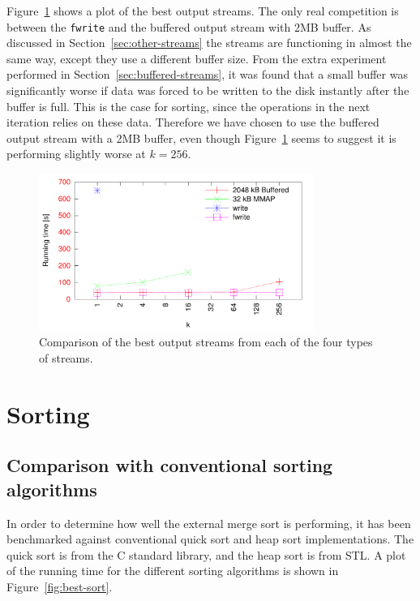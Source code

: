 \documentclass[a4paper,12pt]{article}
\begin{document}
Figure~\ref{fig:best-output} shows a plot of the best output
streams. The only real competition is between the \texttt{fwrite} and
the buffered output stream with 2MB buffer. As discussed in
Section~\ref{sec:other-streams} the streams are functioning in almost
the same way, except they use a different buffer size. From the extra
experiment performed in Section~\ref{sec:buffered-streams}, it was
found that a small buffer was significantly worse if data was forced
to be written to the disk instantly after the buffer is full. This is
the case for sorting, since the operations in the next iteration
relies on these data. Therefore we have chosen to use the buffered
output stream with a 2MB buffer, even though
Figure~\ref{fig:best-output} seems to suggest it is performing
slightly worse at $k = 256$.

\begin{figure}[h!]
  \centering
  \includegraphics[width=0.8\textwidth]{best_output}
  \caption{Comparison of the best output streams from each of the four
    types of streams.}
  \label{fig:best-output}
\end{figure}

\section{Sorting}

\subsection{Comparison with conventional sorting algorithms}
In order to determine how well the external merge sort is performing,
it has been benchmarked against conventional quick sort and heap sort
implementations. The quick sort is from the C standard library, and
the heap sort is from STL. A plot of the running time for the
different sorting algorithms is shown in Figure~\ref{fig:best-sort}.
\end{document}

